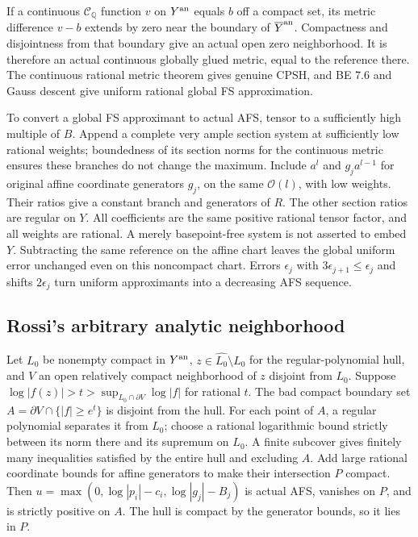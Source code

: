 \documentclass[
  11pt,
]{article}
\begin{document}
If a continuous \(\mathcal C_{\mathbb Q}\) function \(v\) on
\(Y^{\rm an}\) equals \(b\) off a compact set, its metric difference
\(v-b\) extends by zero near the boundary of \(\overline Y^{\rm an}\).
Compactness and disjointness from that boundary give an actual open zero
neighborhood. It is therefore an actual continuous globally glued
metric, equal to the reference there. The continuous rational metric
theorem gives genuine CPSH, and BE 7.6 and Gauss descent give uniform
rational global FS approximation.

To convert a global FS approximant to actual AFS, tensor to a
sufficiently high multiple of \(B\). Append a complete very ample
section system at sufficiently low rational weights; boundedness of its
section norms for the continuous metric ensures these branches do not
change the maximum. Include \(a^l\) and \(g_j a^{l-1}\) for original
affine coordinate generators \(g_j\), on the same \(\mathcal O(l)\),
with low weights. Their ratios give a constant branch and generators of
\(R\). The other section ratios are regular on \(Y\). All coefficients
are the same positive rational tensor factor, and all weights are
rational. A merely basepoint-free system is not asserted to embed \(Y\).
Subtracting the same reference on the affine chart leaves the global
uniform error unchanged even on this noncompact chart. Errors
\(\epsilon_j\) with \(3\epsilon_{j+1}\le\epsilon_j\) and shifts
\(2\epsilon_j\) turn uniform approximants into a decreasing AFS
sequence.

\subsection{Rossi's arbitrary analytic
neighborhood}\label{rossis-arbitrary-analytic-neighborhood}

Let \(L_0\) be nonempty compact in \(Y^{\rm an}\),
\(z\in\widehat{L_0}\setminus L_0\) for the regular-polynomial hull, and
\(V\) an open relatively compact neighborhood of \(z\) disjoint from
\(L_0\). Suppose
\(\log|f(z)|>t>\sup_{\widehat{L_0}\cap\partial V}\log|f|\) for rational
\(t\). The bad compact boundary set \(A=\partial V\cap\{|f|\ge e^t\}\)
is disjoint from the hull. For each point of \(A\), a regular polynomial
separates it from \(L_0\); choose a rational logarithmic bound strictly
between its norm there and its supremum on \(L_0\). A finite subcover
gives finitely many inequalities satisfied by the entire hull and
excluding \(A\). Add large rational coordinate bounds for affine
generators to make their intersection \(P\) compact. Then
\(u=\max(0,\log|p_i|-c_i,\log|g_j|-B_j)\) is actual AFS, vanishes on
\(P\), and is strictly positive on \(A\). The hull is compact by the
generator bounds, so it lies in \(P\).
\end{document}
